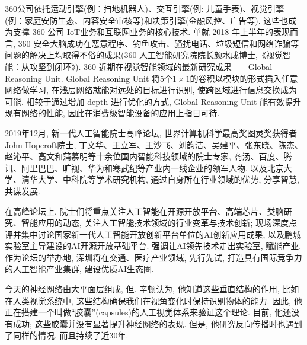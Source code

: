 360公司依托运动引擎(例：扫地机器人)、交互引擎(例: 儿童手表)、视觉引擎(例：家庭安防生态、内容安全审核等)和决策引擎(金融风控、广告等). 这些也成为支撑 360 公司 IoT业务和互联网业务的核心技术. 单就 2018 年上半年的表现而言, 360 安全大脑成功在恶意程序、钓鱼攻击、骚扰电话、垃圾短信和网络诈骗等问题的解决上均取得不俗的成果(360 人工智能研究院院长颜水成博士,《视觉智能：从攻坚到闭环》).
360 近期在视觉智能领域的最新研究成果——Global Reasoning Unit. Global Reasoning Unit 将5个$1\times1$的卷积以模块的形式插入任意网络做学习, 在浅层网络就能对远处的目标进行识别, 使跨区域进行信息交换成为可能. 相较于通过增加 depth 进行优化的方式, Global Reasoning Unit 能有效提升现有网络的性能, 因此在消费级智能设备的应用上指日可待.

2019年12月, 新一代人工智能院士高峰论坛, 世界计算机科学最高奖图灵奖获得者John Hopcroft院士, 丁文华、王立军、王沙飞、刘韵洁、吴建平、张东晓、陈杰、赵沁平、高文和蒲慕明等十余位国内智能科技领域的院士专家, 商汤、百度、腾讯、阿里巴巴、旷视、华为和寒武纪等产业内一线企业的领军人物, 以及北京大学、清华大学、中科院等学术研究机构, 通过自身所在行业领域的优势, 分享智慧, 共谋发展.

在高峰论坛上, 院士们将重点关注人工智能在开源开放平台、高端芯片、类脑研究、智能应用的动态, 关注人工智能技术领域的行业变革与技术创新; 现场深度点评并集中讨论国家新一代人工智能开放创新平台单位的AI创新应用成果, 以及鹏城实验室主导建设的AI开源开放基础平台.
强调让AI领先技术走出实验室, 赋能产业. 作为论坛的举办地, 深圳将在交通、医疗产业领域, 先行先试, 打造具有国际竞争力的人工智能产业集群, 建设优质AI生态圈.

今天的神经网络由大平面层组成, 但. 辛顿认为, 他知道这些垂直结构的作用, 比如在人类视觉系统中, 这些结构确保我们在视角变化时保持识别物体的能力. 因此, 他正在搭建一个叫做“胶囊”(capsules)的人工视觉体系来验证这个理论. 目前, 他还没有成功; 这些胶囊并没有显著提升神经网络的表现. 但是, 他研究反向传播时也遇到了同样的情况, 而且持续了近30年.
